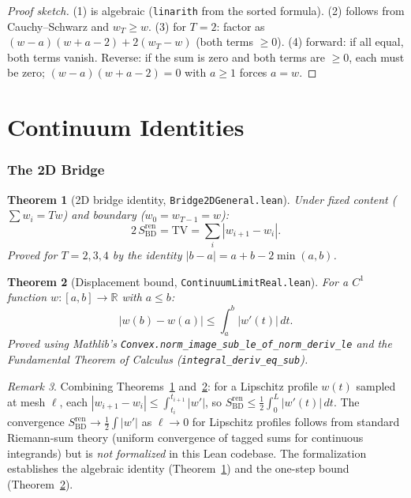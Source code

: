 \documentclass[11pt,a4paper]{article}
\newtheorem{theorem}{Theorem}[section]
\theoremstyle{remark}
\newtheorem{remark}[theorem]{Remark}
\begin{document}
\begin{proof}[Proof sketch]
(1) is algebraic (\texttt{linarith} from the sorted formula).
(2) follows from Cauchy--Schwarz and $w_T \geq w$.
(3) for $T = 2$: factor as $(w{-}a)(w{+}a{-}2) + 2(w_T{-}w)$ (both terms $\geq 0$).
(4) forward: if all equal, both terms vanish. Reverse: if the sum is zero and
both terms are $\geq 0$, each must be zero; $(w{-}a)(w{+}a{-}2) = 0$ with $a \geq 1$
forces $a = w$.
\end{proof}

\part{Continuum Identities}

\section{The 2D Bridge}\label{sec:2dbridge}

\begin{theorem}[2D bridge identity, \texttt{Bridge2DGeneral.lean}]
\label{thm:2dbridge}
Under fixed content ($\sum w_i = Tw$) and boundary ($w_0 = w_{T-1} = w$):
\begin{equation}
  2\,S_{\mathrm{BD}}^{\mathrm{ren}} = \mathrm{TV} = \sum_i |w_{i+1} - w_i|.
\end{equation}
Proved for $T = 2, 3, 4$ by the identity $|b{-}a| = a + b - 2\min(a,b)$.
\end{theorem}

\begin{theorem}[Displacement bound, \texttt{ContinuumLimitReal.lean}]
\label{thm:displacement}
For a $C^1$ function $w\colon [a,b] \to \mathbb{R}$ with $a \leq b$:
\begin{equation}
  |w(b) - w(a)| \leq \int_a^b |w'(t)|\,dt.
\end{equation}
Proved using Mathlib's \texttt{Convex.norm\_image\_sub\_le\_of\_norm\_deriv\_le}
and the Fundamental Theorem of Calculus (\texttt{integral\_deriv\_eq\_sub}).
\end{theorem}

\begin{remark}
Combining Theorems~\ref{thm:2dbridge} and~\ref{thm:displacement}:
for a Lipschitz profile $w(t)$ sampled at mesh $\ell$, each
$|w_{i+1}-w_i| \leq \int_{t_i}^{t_{i+1}} |w'|$, so
$S_{\mathrm{BD}}^{\mathrm{ren}} \leq \frac{1}{2}\int_0^L |w'(t)|\,dt$.
The convergence $S_{\mathrm{BD}}^{\mathrm{ren}} \to \frac{1}{2}\int|w'|$ as
$\ell \to 0$ for Lipschitz profiles follows from standard Riemann-sum theory
(uniform convergence of tagged sums for continuous integrands) but is
\emph{not formalized} in this Lean codebase. The formalization establishes
the algebraic identity (Theorem~\ref{thm:2dbridge}) and the one-step bound
(Theorem~\ref{thm:displacement}).
\end{remark}
\end{document}
